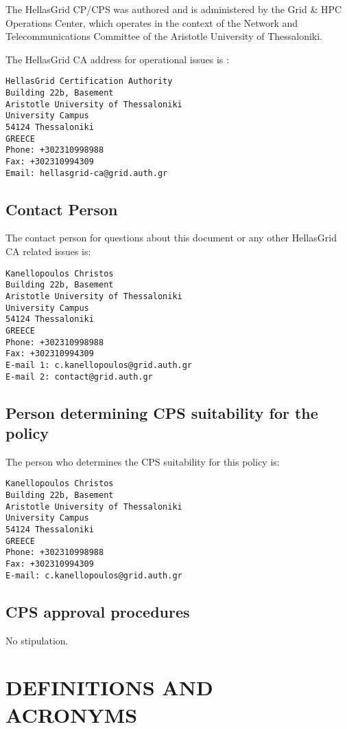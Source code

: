 \documentclass[11pt,a4paper,titlepage]{book}
\begin{document}
The HellasGrid CP/CPS was authored and is administered by the Grid \& HPC Operations Center, which operates in the context of the Network and Telecommunications Committee of the Aristotle University of Thessaloniki.

The HellasGrid CA address for operational issues is :

\begin{verbatim}
HellasGrid Certification Authority
Building 22b, Basement
Aristotle University of Thessaloniki
University Campus
54124 Thessaloniki
GREECE
Phone: +302310998988
Fax: +302310994309
Email: hellasgrid-ca@grid.auth.gr
\end{verbatim}

\subsection{Contact Person}
\label{sub:ContactPerson}

The contact person for questions about this document or any other HellasGrid CA related issues is:

\begin{verbatim}
Kanellopoulos Christos
Building 22b, Basement
Aristotle University of Thessaloniki
University Campus
54124 Thessaloniki
GREECE
Phone: +302310998988
Fax: +302310994309
E-mail 1: c.kanellopoulos@grid.auth.gr
E-mail 2: contact@grid.auth.gr
\end{verbatim}

\subsection{Person determining CPS suitability for the policy}

The person who determines the CPS suitability for this policy is:

\begin{verbatim}
Kanellopoulos Christos
Building 22b, Basement
Aristotle University of Thessaloniki
University Campus
54124 Thessaloniki
GREECE
Phone: +302310998988
Fax: +302310994309
E-mail: c.kanellopoulos@grid.auth.gr
\end{verbatim}

\subsection{CPS approval procedures}

No stipulation.

\newpage

\section{DEFINITIONS AND ACRONYMS}
\end{document}
